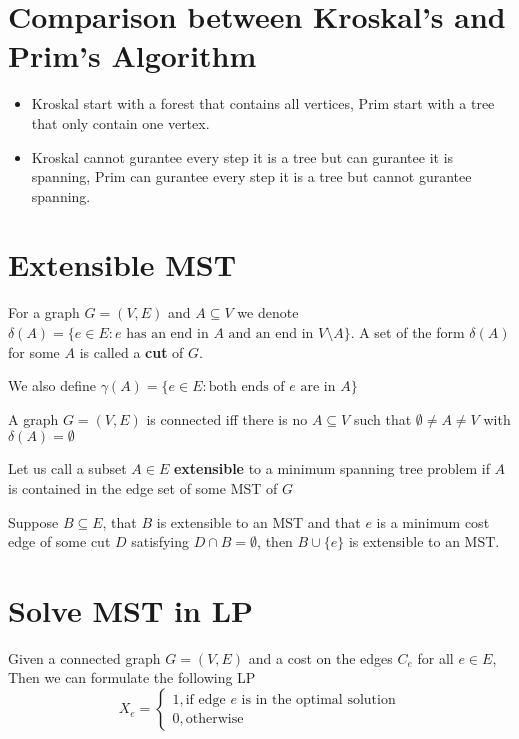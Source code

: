 		\section{Comparison between Kroskal's and Prim's Algorithm}
			\begin{itemize}
				\item Kroskal start with a forest that contains all vertices, Prim start with a tree that only contain one vertex.
				\item Kroskal cannot gurantee every step it is a tree but can gurantee it is spanning, Prim can gurantee every step it is a tree but cannot gurantee spanning.
			\end{itemize}

		\section{Extensible MST}
			\begin{definition}[cut]
				For a graph $G=(V, E)$ and $A \subseteq V$ we denote $\delta(A) = \{e \in E :\text{$e$ has an end in $A$ and an end in $V\setminus A$}\}$. A set of the form $\delta(A)$ for some $A$ is called a \textbf{cut} of $G$.
			\end{definition}

			\begin{definition}
				We also define $\gamma(A) = \{e\in E: \text{both ends of $e$ are in $A$}\}$				
			\end{definition}

			\begin{theorem}
				A graph $G=(V, E)$ is connected iff there is no $A\subseteq V$ such that $\emptyset \ne A \ne V$ with $\delta(A) = \emptyset$
			\end{theorem}

			\begin{definition}
				Let us call a subset $A \in E$ \textbf{extensible} to a minimum spanning tree problem if $A$ is contained in the edge set of some MST of $G$
			\end{definition}

			\begin{theorem}
				Suppose $B \subseteq E$, that $B$ is extensible to an MST and that $e$ is a minimum cost edge of some cut $D$ satisfying $D\cap B = \emptyset$, then $B\cup \{e\}$ is extensible to an MST.
			\end{theorem}

		\section{Solve MST in LP}
			Given a connected graph $G=(V, E)$ and a cost on the edges $C_e$ for all $e\in E$, Then we can formulate the following LP
			\begin{equation}
				X_e = \begin{cases}
					1, \text{if edge $e$ is in the optimal solution} \\
					0, \text{otherwise}
				\end{cases}
			\end{equation}


